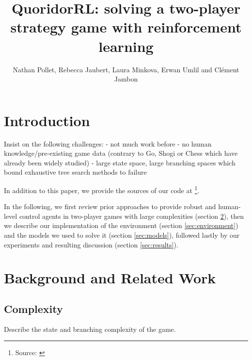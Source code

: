 \documentclass[journal, a4paper]{IEEEtran}
\newif\ifanonymous
\begin{document}
\title{QuoridorRL: solving a two-player strategy game with reinforcement learning}
\ifanonymous
\author{Anonymous Authors}
\else
\author{Nathan Pollet, Rebecca Jaubert, Laura Minkova, Erwan Umlil and Clément Jambon}
\fi
\maketitle

\begin{abstract}

\end{abstract}

\section{Introduction}
\label{sec:intro}

Insist on the following challenges:
- not much work before
- no human knowledge/pre-existing game data (contrary to Go, Shogi or Chess which have already been widely studied)
- large state space, large branching spaces which bound exhaustive tree search methods to failure

In addition to this paper, we provide the sources of our code at  \footnote{Source: \url{}}. 

In the following, we first review prior approaches to provide robust and human-level control agents in two-player games with large complexities (section \ref{sec:background}), then we describe our implementation of the environment (section \ref{sec:environment}) and the models we used to solve it (section \ref{sec:models}), followed lastly by our experiments and resulting discussion (section \ref{sec:results}).

\section{Background and Related Work}
\label{sec:background}

\subsection{Complexity}
\label{ssec:complexity}
Describe the state and branching complexity of the game.
\end{document}
